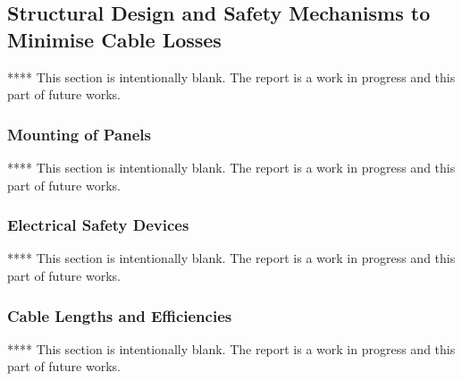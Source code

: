 \subsection{Structural Design and Safety Mechanisms to Minimise Cable Losses}

****
\newline
This section is intentionally blank. The report is a work in progress and this part of future works.  

\subsubsection{Mounting of Panels}

****
\newline
This section is intentionally blank. The report is a work in progress and this part of future works.  

\subsubsection{Electrical Safety Devices}

****
\newline
This section is intentionally blank. The report is a work in progress and this part of future works.  

\subsubsection{Cable Lengths and Efficiencies}

****
\newline
This section is intentionally blank. The report is a work in progress and this part of future works.  